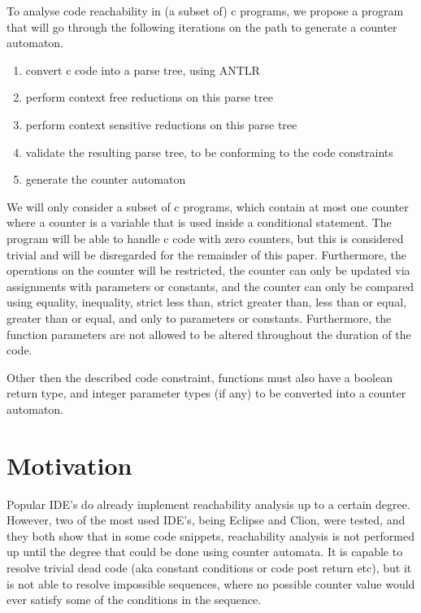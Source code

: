 \documentclass[12pt]{article}
\begin{document}
To analyse code reachability in (a subset of) c programs, we propose a program that will go through the following iterations on the path to generate a counter automaton.

\begin{enumerate}
	\item convert c code into a parse tree, using ANTLR
	\item perform context free reductions on this parse tree
	\item perform context sensitive reductions on this parse tree
	\item validate the resulting parse tree, to be conforming to the code constraints
	\item generate the counter automaton
\end{enumerate}

We will only consider a subset of c programs, which contain at most one counter where a counter is a variable that is used inside a conditional statement. The program will be able to handle c code with zero counters, but this is considered trivial and will be disregarded for the remainder of this paper. Furthermore, the operations on the counter will be restricted, the counter can only be updated via assignments with parameters or constants, and the counter can only be compared using equality, inequality, strict less than, strict greater than, less than or equal, greater than or equal, and only to parameters or constants. Furthermore, the function parameters are not allowed to be altered throughout the duration of the code.

Other then the described code constraint, functions must also have a boolean return type, and integer parameter types (if any) to be converted into a counter automaton.

\section{Motivation}
Popular IDE's do already implement reachability analysis up to a certain degree. However, two of the most used IDE's, being Eclipse and Clion, were tested, and they both show that in some code snippets, reachability analysis is not performed up until the degree that could be done using counter automata. It is capable to resolve trivial dead code (aka constant conditions or code post return etc), but it is not able to resolve impossible sequences, where no possible counter value would ever satisfy some of the conditions in the sequence.
\end{document}
